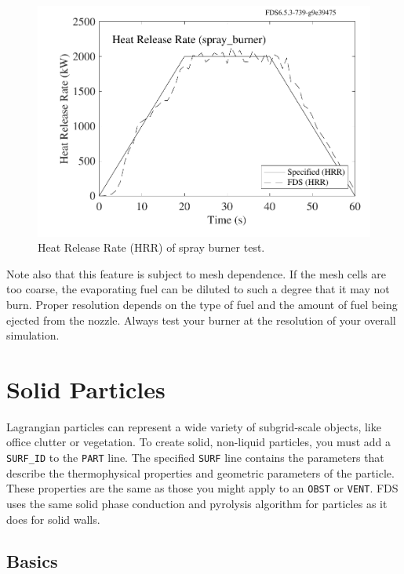 \documentclass[11pt]{book}
\newcommand{\ct}{\tt\small}
\begin{document}
\begin{figure}[ht]
\begin{center}
\includegraphics[width=4.5in]{SCRIPT_FIGURES/spray_burner_HRR}
\end{center}
\caption[Results of the {\ct spray\_burner} test case]{Heat Release Rate (HRR) of spray burner test.}
\label{spray_burner}
\end{figure}

Note also that this feature is subject to mesh
dependence. If the mesh cells are too coarse, the
evaporating fuel can be diluted to such a degree that it
may not burn. Proper resolution depends on the type of
fuel and the amount of fuel being ejected from the
nozzle. Always test your burner at the resolution of your overall simulation.

\clearpage

\section{Solid Particles}
\label{info:PART_SURF}

Lagrangian particles can represent a wide variety of subgrid-scale objects, like office clutter or vegetation. To create solid, non-liquid particles, you must add a {\ct SURF\_ID} to the {\ct PART} line. The specified {\ct SURF} line contains the parameters that describe the thermophysical properties and geometric parameters of the particle. These properties are the same as those you might apply to an {\ct OBST} or {\ct VENT}. FDS uses the same solid phase conduction and pyrolysis algorithm for particles as it does for solid walls.

\subsection{Basics}
\end{document}
